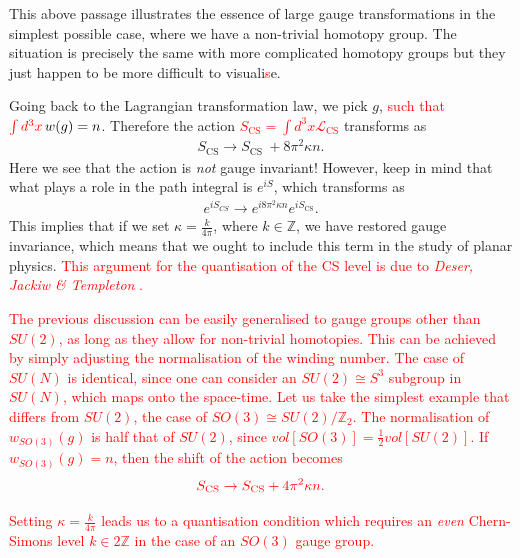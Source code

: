 This above passage illustrates the essence of large gauge transformations in the simplest possible case, where we have a non-trivial homotopy group. The situation is precisely the same with more complicated homotopy groups but they just happen to be more difficult to visuali\textcolor{red}{s}e.

    Going back to the Lagrangian transformation law, we pick $g$, \textcolor{red}{such that} $\textcolor{red}{\int d^3 x} \,w(g)=n$. Therefore the action \textcolor{red}{$S_{\text{CS}} = \int d^3x \mathcal{L}_{\text{CS}}$} transforms as
    \begin{align}
        S_{\text{CS}} \rightarrow S_{\text{CS } }+ 8 \pi^2 \kappa n.
    \end{align}
    Here we see that the action is \textit{not} gauge invariant! However, keep in mind that what plays a role in the path integral is $e^{i S}$, which transforms as
    \begin{align}
        e^{i S_{CS}} \rightarrow e^{i 8 \pi^2 \kappa n} e^{i S_{\text{CS}}}.
    \end{align}
    This implies that if we set $\kappa = \frac{k}{4 \pi}$, where $k\in \mathbb{Z}$, we have restored gauge invariance, which means that we ought to include this term in the study of planar physics. \textcolor{red}{This argument for the quantisation of the CS level is due to \textit{Deser, Jackiw \& Templeton} \cite{Deser:1981wh}. }

    \textcolor{red}{The previous discussion can be easily generali\textcolor{red}{s}ed to gauge groups  other than $SU(2)$, as long as they allow for non-trivial homotopies. This can be achieved by simply adjusting the normali\textcolor{red}{s}ation of the winding number. The case of $SU(N)$ is identical, since one can consider an $SU(2) \cong S^3$ subgroup in $SU(N)$, which maps onto the space-time. Let us take the simplest example that differs from $SU(2)$, the case of $SO(3)\cong SU(2)/ \mathbb{Z}_2$. The normali\textcolor{red}{s}ation of $w_{SO(3)}(g)$ is half that of $SU(2)$, since $vol[SO(3)] = \frac{1}{2} vol[SU(2)]$. If $w_{SO(3)}(g)=n$, then the shift of the action becomes }
\begin{align}
    \textcolor{red}{S_{\text{CS}} \rightarrow S_{\text{CS}}+ 4\pi^2 \kappa n.}
\end{align}

\textcolor{red}{Setting $\kappa = \frac{k}{4 \pi}$ leads us to a quanti\textcolor{red}{s}ation condition which requires an \textit{even} Chern-Simons level $k \in 2\mathbb{Z}$ in the case of an $SO(3)$ gauge group.}

